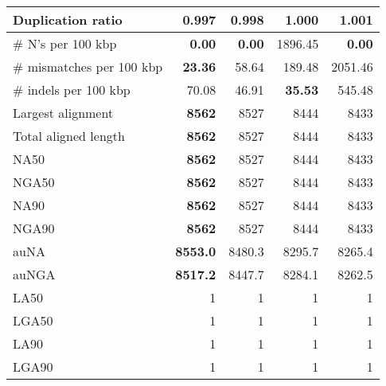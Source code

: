 \documentclass[12pt,a4paper]{article}
\begin{document}
\begin{table}[ht]
\begin{center}
\begin{tabular}{|l*{4}{|r}|}
Duplication ratio & {\bf 0.997} & 0.998 & 1.000 & 1.001 \\ \hline
\# N's per 100 kbp & {\bf 0.00} & {\bf 0.00} & 1896.45 & {\bf 0.00} \\ \hline
\# mismatches per 100 kbp & {\bf 23.36} & 58.64 & 189.48 & 2051.46 \\ \hline
\# indels per 100 kbp & 70.08 & 46.91 & {\bf 35.53} & 545.48 \\ \hline
Largest alignment & {\bf 8562} & 8527 & 8444 & 8433 \\ \hline
Total aligned length & {\bf 8562} & 8527 & 8444 & 8433 \\ \hline
NA50 & {\bf 8562} & 8527 & 8444 & 8433 \\ \hline
NGA50 & {\bf 8562} & 8527 & 8444 & 8433 \\ \hline
NA90 & {\bf 8562} & 8527 & 8444 & 8433 \\ \hline
NGA90 & {\bf 8562} & 8527 & 8444 & 8433 \\ \hline
auNA & {\bf 8553.0} & 8480.3 & 8295.7 & 8265.4 \\ \hline
auNGA & {\bf 8517.2} & 8447.7 & 8284.1 & 8262.5 \\ \hline
LA50 & 1 & 1 & 1 & 1 \\ \hline
LGA50 & 1 & 1 & 1 & 1 \\ \hline
LA90 & 1 & 1 & 1 & 1 \\ \hline
LGA90 & 1 & 1 & 1 & 1 \\ \hline
\end{tabular}
\end{center}
\end{table}
\end{document}
